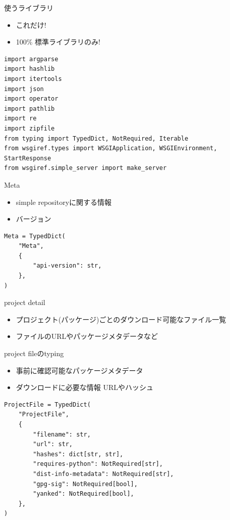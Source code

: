 \documentclass[presentation]{beamer}
\begin{document}
\begin{frame}[label={sec:org9d0bc8c},fragile]{使うライブラリ}
 \begin{itemize}
\item これだけ!
\item 100\% 標準ライブラリのみ!
\end{itemize}

\begin{verbatim}
import argparse
import hashlib
import itertools
import json
import operator
import pathlib
import re
import zipfile
from typing import TypedDict, NotRequired, Iterable
from wsgiref.types import WSGIApplication, WSGIEnvironment, StartResponse
from wsgiref.simple_server import make_server
\end{verbatim}
\end{frame}

\begin{frame}[label={sec:orgdd30b84},fragile]{Meta}
 \begin{itemize}
\item simple repositoryに関する情報
\item バージョン
\end{itemize}

\begin{verbatim}
Meta = TypedDict(
    "Meta",
    {
        "api-version": str,
    },
)
\end{verbatim}
\end{frame}

\begin{frame}[label={sec:orgd971e48}]{project detail}
\begin{itemize}
\item プロジェクト(パッケージ)ごとのダウンロード可能なファイル一覧
\item ファイルのURLやパッケージメタデータなど
\end{itemize}
\end{frame}

\begin{frame}[label={sec:orgb509114},fragile]{project fileのtyping}
 \begin{itemize}
\item 事前に確認可能なパッケージメタデータ
\item ダウンロードに必要な情報 URLやハッシュ
\end{itemize}

\begin{verbatim}
ProjectFile = TypedDict(
    "ProjectFile",
    {
        "filename": str,
        "url": str,
        "hashes": dict[str, str],
        "requires-python": NotRequired[str],
        "dist-info-metadata": NotRequired[str],
        "gpg-sig": NotRequired[bool],
        "yanked": NotRequired[bool],
    },
)

\end{verbatim}
\end{frame}
\end{document}
